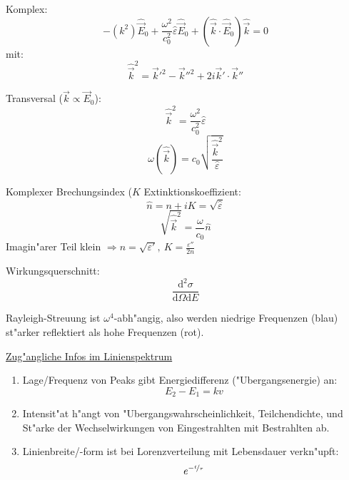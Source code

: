 \documentclass[12pt]{report}
\newcommand{\vepsilon}{\varepsilon}
\newcommand{\dd}{\mathrm{d}}
\begin{document}
Komplex:
\[-(k^2)\hat{\vec{E}}_0+\frac{\omega^2}{c_0^2}\hat{\vepsilon}\hat{\vec{E}}_0+(\hat{\vec{k}}\cdot\hat{\vec{E}}_0)\hat{\vec{k}}=0\]
mit:
\[\hat{\vec{k}}^2=\vec{k}'^2-\vec{k}''^2+2i\vec{k}'\cdot\vec{k}''\]

Transversal ($\vec{k}\propto\vec{E}_0$):
\[\hat{\vec{k}}^2=\frac{\omega^2}{c_0^2}\hat{\vepsilon}\]
\[\omega(\hat{\vec{k}})=c_0\sqrt{\frac{\hat{\vec{k}}^2}{\hat{\vepsilon}}}\]

Komplexer Brechungsindex ($K$ Extinktionskoeffizient:
\[\hat{n}=n+iK=\sqrt{\hat{\vepsilon}}\]
\[\sqrt{\hat{\vec{k}}^2}=\frac{\omega}{c_0}\hat{n}\]
Imagin"arer Teil klein $\Rightarrow n=\sqrt{\vepsilon'},\ K=\frac{\vepsilon''}{2n}$

Wirkungsquerschnitt:
\[\frac{\dd^2\sigma}{\dd\Omega\dd E}\]

Rayleigh-Streuung ist $\omega^4$-abh"angig, also werden niedrige Frequenzen (blau) st"arker reflektiert als hohe Frequenzen (rot).

\underline{Zug"angliche Infos im Linienspektrum}
\begin{enumerate}
\item Lage/Frequenz von Peaks gibt Energiedifferenz ("Ubergangsenergie) an:
\[E_2-E_1=kv\]
\item Intensit"at h"angt von "Ubergangswahrscheinlichkeit, Teilchendichte, und St"arke der Wechselwirkungen von Eingestrahlten mit Bestrahlten ab.
\item Linienbreite/-form ist bei Lorenzverteilung mit Lebensdauer verkn"upft:
\[e^{-\nicefrac{t}{\tau}}\]
\end{enumerate}



\end{document}
